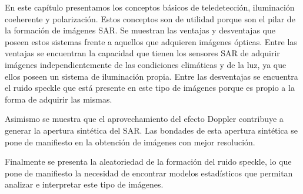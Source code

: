 En este capítulo presentamos los conceptos básicos de teledetección, iluminación coeherente y polarización. Estos conceptos son de utilidad porque son el pilar de la formación de imágenes SAR. Se muestran las ventajas y desventajas que poseen estos sistemas frente a aquellos que adquieren imágenes ópticas. Entre las ventajas se encuentran la capacidad que tienen los sensores SAR de adquirir imágenes independientemente de las condiciones climáticas y de la luz, ya que ellos poseen un sistema de iluminación propia. Entre las desventajas se encuentra el ruido speckle que está presente en este tipo de imágenes porque es propio a la forma de adquirir las mismas. 

Asimismo se muestra que el aprovechamiento del efecto Doppler contribuye a generar la apertura sintética del SAR. Las bondades de esta apertura sintética se pone de manifiesto en la obtención de imágenes con  mejor resolución.

Finalmente se presenta la aleatoriedad de la formación del ruido speckle, lo que pone de manifiesto la necesidad de encontrar modelos estadísticos que permitan analizar e interpretar este tipo de imágenes.

%

